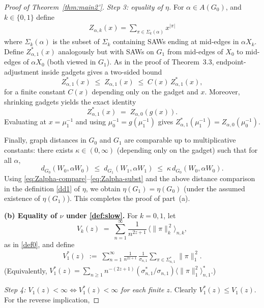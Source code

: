 \documentclass[10pt,a4paper]{amsart}
\begin{document}
\begin{proof}[Proof of Theorem~\ref{thm:main2'}]
\smallskip\noindent
\emph{Step 3: equality of $\eta$.}
For $\alpha\in A(G_0)$, and $k\in\{0,1\}$ define 
\begin{align*}
Z_{\alpha,k}(x)=\sum_{\pi\in \Sigma_k(\alpha)}x^{|\pi|}
\end{align*}
where $\Sigma_k(\alpha
)$ is the subset of $\Sigma_k$ containing SAWs ending at mid-edges in $\alpha X_k$.
Define $Z_{\alpha,1}^\ast(x)$ analogously but with SAWs on $G_1$ from mid-edges of $X_0$ to mid-edges of
$\alpha X_0$ (both viewed in $G_1$).  As in the proof of Theorem~3.3, endpoint-adjustment inside gadgets gives
a two-sided bound
\begin{equation}\label{eq:Zalpha-compare}
Z_{\alpha,1}^\ast(x)\;\le\; Z_{\alpha,1}(x)\;\le\;C(x)\,Z_{\alpha,1}^\ast(x),
\end{equation}
for a finite constant $C(x)$ depending only on the gadget and $x$.
Moreover, shrinking gadgets yields the exact identity
\begin{equation}\label{eq:Zalpha-subst}
Z_{\alpha,1}^\ast(x)\;=\;Z_{\alpha,0}(g(x)).
\end{equation}
Evaluating at $x=\mu_1^{-1}$ and using $\mu_0^{-1}=g(\mu_1^{-1})$ gives
$Z_{\alpha,1}^\ast(\mu_1^{-1})=Z_{\alpha,0}(\mu_0^{-1})$.

Finally, graph distances in $G_0$ and $G_1$ are comparable up to multiplicative constants:
there exists $\kappa\in(0,\infty)$ (depending only on the gadget) such that for all $\alpha$,
\[
d_{G_0}(W_0,\alpha W_0)\;\le\; d_{G_1}(W_1,\alpha W_1)\;\le\;\kappa\, d_{G_0}(W_0,\alpha W_0).
\]
Using \eqref{eq:Zalpha-compare}--\eqref{eq:Zalpha-subst} and the above distance comparison in the definition
\eqref{dd1} of $\eta$, we obtain $\eta(G_1)=\eta(G_0)$ (under the assumed existence of $\eta(G_1)$).
This completes the proof of part~(a).

\medskip\noindent
\textbf{(b) Equality of $\nu$ under \eqref{def:slow}.}
For $k=0,1$, let
\[
V_k(z)\;=\;\sum_{n=1}^\infty \frac{1}{n^{2z+1}}\,\Big\langle \|\pi\|_k^{\,2}\Big\rangle_{n,k},
\]
as in \eqref{def0}, and define
\begin{align}
V_1^\ast(z)\;:=\;\sum_{n=1}^\infty \frac{1}{n^{2z+1}}\,
\frac{1}{\sigma_{n,1}}\sum_{\pi\in\Sigma_{n,1}^\ast}\|\pi\|_1^{\,2}.\label{dv1s}
\end{align}
(Equivalently, $V_1^\ast(z)=\sum_{n\ge 1}n^{-(2z+1)}(\sigma_{n,1}^\ast/\sigma_{n,1})\langle\|\pi\|_1^2\rangle_{n,1}^\ast$.)

\smallskip\noindent
\emph{Step 4: $V_1(z)<\infty \iff V_1^\ast(z)<\infty$ for each finite $z$.}
Clearly $V_1^\ast(z)\le V_1(z)$.
For the reverse implication,  




\end{proof}
\end{document}
